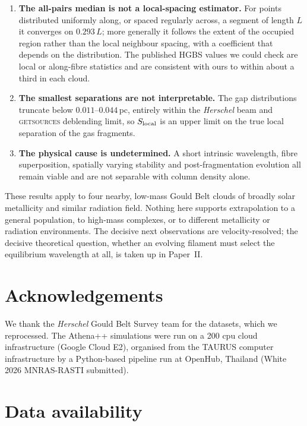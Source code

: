 \documentclass[usenatbib,twoside,twocolumn]{mnras}
\begin{document}
\begin{enumerate}
\item \textbf{The all-pairs median is not a local-spacing estimator.} For points distributed uniformly along, or spaced regularly across, a segment of length $L$ it converges on $0.293\,L$; more generally it follows the extent of the occupied region rather than the local neighbour spacing, with a coefficient that depends on the distribution. The published HGBS values we could check are local or along-fibre statistics and are consistent with ours to within about a third in each cloud.
\item \textbf{The smallest separations are not interpretable.} The gap distributions truncate below $0.011$--$0.044$\,pc, entirely within the \textit{Herschel} beam and \textsc{getsources} deblending limit, so $S_{\rm local}$ is an upper limit on the true local separation of the gas fragments.
\item \textbf{The physical cause is undetermined.} A short intrinsic wavelength, fibre superposition, spatially varying stability and post-fragmentation evolution all remain viable and are not separable with column density alone.
\end{enumerate}

These results apply to four nearby, low-mass Gould Belt clouds of broadly solar metallicity and similar radiation field. Nothing here supports extrapolation to a general population, to high-mass complexes, or to different metallicity or radiation environments. The decisive next observations are velocity-resolved; the decisive theoretical question, whether an evolving filament must select the equilibrium wavelength at all, is taken up in Paper~II.

\section*{Acknowledgements}

We thank the \textit{Herschel} Gould Belt Survey team for the datasets, which we reprocessed. The Athena++ simulations were run on a 200 cpu cloud infrastructure (Google Cloud E2), organised from the TAURUS computer infrastructure by a Python-based pipeline run at OpenHub, Thailand (White 2026 MNRAS-RASTI submitted).

\section*{Data availability}
\end{document}
